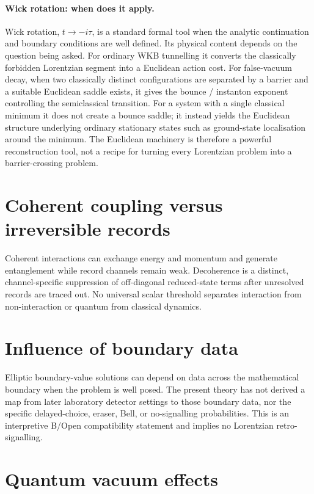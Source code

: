 \documentclass[11pt,a4paper]{article}
\begin{document}
\paragraph{Wick rotation: when does it apply.}
Wick rotation, $t\to-i\tau$, is a standard formal tool when the
analytic continuation and boundary conditions are well defined. Its
physical content depends on the question being asked. For ordinary
WKB tunnelling it converts the classically forbidden Lorentzian segment
into a Euclidean action cost. For false-vacuum decay, when two
classically distinct configurations are separated by a barrier and a
suitable Euclidean saddle exists, it gives the bounce / instanton
exponent controlling the semiclassical transition. For a system with a
single classical minimum it does not create a bounce saddle; it instead
yields the Euclidean structure underlying ordinary stationary states
such as ground-state localisation around the minimum. The Euclidean
machinery is therefore a powerful reconstruction tool, not a recipe for
turning every Lorentzian problem into a barrier-crossing problem.


\section{Coherent coupling versus irreversible records}

Coherent interactions can exchange energy and momentum and generate
entanglement while record channels remain weak.  Decoherence is a distinct,
channel-specific suppression of off-diagonal reduced-state terms after
unresolved records are traced out.  No universal scalar threshold separates
interaction from non-interaction or quantum from classical dynamics.

\section{Influence of boundary data}
\label{sec:pop_future}

Elliptic boundary-value solutions can depend on data across the mathematical
boundary when the problem is well posed.  The present theory has not derived a
map from later laboratory detector settings to those boundary data, nor the
specific delayed-choice, eraser, Bell, or no-signalling probabilities.  This
is an interpretive B/Open compatibility statement and implies no Lorentzian
retro-signalling.

\section{Quantum vacuum effects}
\end{document}
